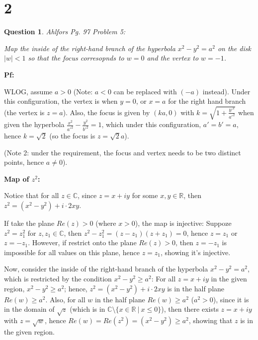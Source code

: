 \documentclass{article}
\newtheorem{question}{Question}
\begin{document}
\break

\section*{2}
\begin{myBox}[]{}
    \begin{question}
        Ahlfors Pg. 97 Problem 5:

        Map the inside of the right-hand branch of the hyperbola $x^2-y^2=a^2$ on the disk $|w|<1$
        so that the focus corresopnds to $w=0$ and the vertex to $w=-1$.
    \end{question}
\end{myBox}

\textbf{Pf:}

WLOG, assume $a>0$ (Note: $a<0$ can be replaced with $(-a)$ instead). Under this configuration, the vertex is when $y=0$, or $x=a$ for the right hand branch (the vertex is $z=a$).
Also, the focus is given by $(ka,0)$ with $k=\sqrt{1+\frac{b'^2}{a'^2}}$ when given the hyperbola $\frac{x^2}{a'^2}-\frac{y^2}{b'^2}=1$,
which under this configuration, $a'=b'=a$, hence $k=\sqrt{2}$ (so the focus is $z=\sqrt{2}a$).

(Note 2: under the requirement, the focus and vertex needs to be two distinct points, hence $a\neq 0$).

\hfill

\textbf{Map of $z^2$:}

Notice that for all $z\in\mathbb{C}$, since $z=x+iy$ for some $x,y\in\mathbb{R}$, then $z^2=(x^2-y^2)+i\cdot 2xy$.

If take the plane $Re(z)>0$ (where $x>0$), the map is injective: Suppoze $z^2=z_1^2$ for $z,z_1\in\mathbb{C}$, 
then $z^2-z_1^2=(z-z_1)(z+z_1)=0$, hence $z=z_1$ or $z=-z_1$. However, if restrict onto the plane $Re(z)>0$, then $z=-z_1$ is impossible for all values on this plane, hence $z=z_1$, showing it's injective.

\hfill

Now, consider the inside of the right-hand branch of the hyperbola $x^2-y^2=a^2$, which is restricted by the condition $x^2-y^2\geq a^2$:
For all $z=x+iy$ in the given region, $x^2-y^2\geq a^2$; hence, $z^2=(x^2-y^2)+i\cdot 2xy$ is in the half plane $Re(w)\geq a^2$.
Also, for all $w$ in the half plane $Re(w)\geq a^2$ ($a^2>0$), since it is in the domain of $\sqrt{z}$ (which is in $\mathbb{C}\setminus\{x\in\mathbb{R}\ |\ x\leq 0\}$),
then there exists $z=x+iy$ with $z=\sqrt{w}$, hence $Re(w)=Re(z^2)=(x^2-y^2)\geq a^2$, showing that $z$ is in the given region.
\end{document}

